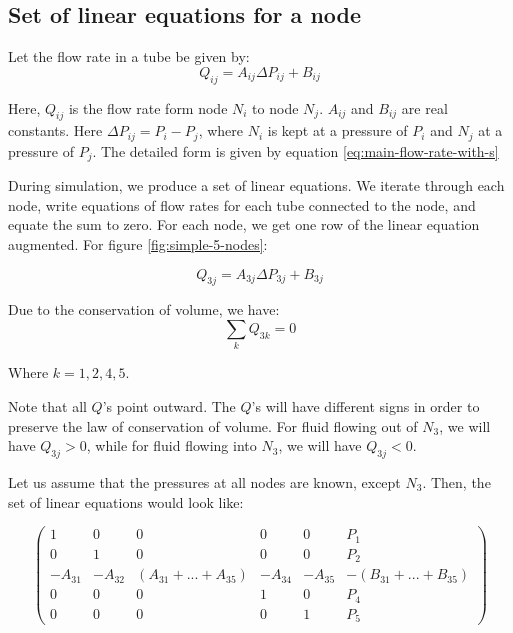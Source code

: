 \subsection{Set of linear equations for a node} \label{sec:linear-equ}
	
	Let the flow rate in a tube be given by:
	\begin{equation}  \label{eq:flow-rate-simple-coeff}
		Q_{ij} = A_{ij}\Delta P_{ij} + B_{ij}
	\end{equation}
	
	Here, $Q_{ij}$ is the flow rate form node $N_i$ to node $N_j$. $A_{ij}$ and $B_{ij}$ are real constants. Here $\Delta P_{ij} = P_i - P_j$, where $N_i$ is kept at a pressure of $P_i$ and $N_j$ at a pressure of $P_j$. The detailed form is given by equation \ref{eq:main-flow-rate-with-s}
	
	During simulation, we produce a set of linear equations. We iterate through each node, write equations of flow rates for each tube connected to the node, and equate the sum to zero. For each node, we get one row of the linear equation augmented. For figure \ref{fig:simple-5-nodes}:
	
	\begin{equation}
		Q_{3j} = A_{3j}\Delta P_{3j} + B_{3j}
	\end{equation}

	Due to the conservation of volume, we have:
	\begin{equation}
		\sum_{k} Q_{3k} = 0
	\end{equation}
	
	Where $k = {1, 2, 4, 5}$.
	
	Note that all $Q$'s point outward. The $Q$'s will have different signs in order to preserve the law of conservation of volume. For fluid flowing out of $N_3$, we will have $Q_{3j} > 0$, while for fluid flowing into $N_3$, we will have $Q_{3j} < 0$.
	
	Let us assume that the pressures at all nodes are known, except $N_3$. Then, the set of linear equations would look like:
	
	\begin{equation} \label{eq:matrix-open-sys-5-nodes}
		\begin{pmatrix}
			1 & 0 & 0 & 0 & 0 & P_{1}\\
			0 & 1 & 0 & 0 & 0 & P_{2}\\
			-A_{31} & -A_{32} & (A_{31} + ... + A_{35}) & -A_{34} & -A_{35} & -(B_{31} + ... + B_{35})\\
			0 & 0 & 0 & 1 & 0 & P_{4}\\
			0 & 0 & 0 & 0 & 1 & P_{5}
		\end{pmatrix}
	\end{equation}

